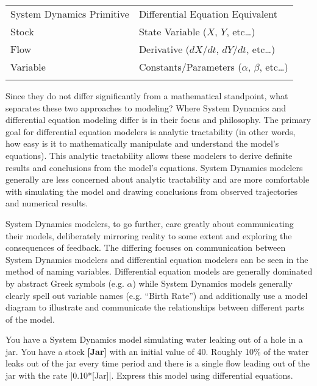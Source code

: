\documentclass[]{memoir}
\newcommand{\FloatTok}[1]{\textcolor[rgb]{0.25,0.63,0.44}{{#1}}}
\newcommand{\NormalTok}[1]{{#1}}
\newcommand{\p}[1]{\textbf{{[}#1{]}}}
\begin{document}
\begin{longtable}[c]{@{}ll@{}}
\hline\noalign{\medskip}
System Dynamics Primitive & Differential Equation Equivalent
\\\noalign{\medskip}
\hline\noalign{\medskip}
Stock & State Variable ($X$, $Y$, etc\ldots{})
\\\noalign{\medskip}
Flow & Derivative ($dX/dt$, $dY/dt$, etc\ldots{})
\\\noalign{\medskip}
Variable & Constants/Parameters ($\alpha$, $\beta$, etc\ldots{})
\\\noalign{\medskip}
\hline
\end{longtable}

Since they do not differ significantly from a mathematical standpoint,
what separates these two approaches to modeling? Where System Dynamics
and differential equation modeling differ is in their focus and
philosophy. The primary goal for differential equation modelers is
analytic tractability (in other words, how easy is it to mathematically
manipulate and understand the model's equations). This analytic
tractability allows these modelers to derive definite results and
conclusions from the model's equations. System Dynamics modelers
generally are less concerned about analytic tractability and are more
comfortable with simulating the model and drawing conclusions from
observed trajectories and numerical results.

System Dynamics modelers, to go further, care greatly about
communicating their models, deliberately mirroring reality to some
extent and exploring the consequences of feedback. The differing focuses
on communication between System Dynamics modelers and differential
equation modelers can be seen in the method of naming variables.
Differential equation models are generally dominated by abstract Greek
symbols (e.g. $\alpha$) while System Dynamics models generally clearly
spell out variable names (e.g. ``Birth Rate'') and additionally use a
model diagram to illustrate and communicate the relationships between
different parts of the model.


You have a System Dynamics model simulating water leaking out of a hole
in a jar. You have a stock \p{Jar} with an initial value of 40. Roughly
10\% of the water leaks out of the jar every time period and there is a
single flow leading out of the jar with the rate
|\FloatTok{0.10}\NormalTok{*[Jar]}|. Express this model using
differential equations.
\end{document}
